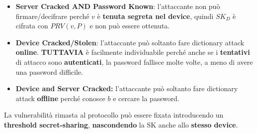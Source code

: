 \begin{itemize}
    \item \textbf{Server Cracked AND Password Known}: l'attaccante non può firmare/decifrare perché $v$ è \textbf{tenuta segreta nel device}, quindi $SK_D$ è cifrata con $PRV(v,P)$ e non può essere ottenuta.
    \item \textbf{Device Cracked/Stolen}: l'attaccante può soltanto fare dictionary attack \textbf{online}. \textbf{TUTTAVIA} è facilmente individuabile perché anche se i \textbf{tentativi} di attacco sono \textbf{autenticati}, la password fallisce molte volte, a meno di avere una password difficile.
    \item \textbf{Device and Server Cracked:} l'attaccante può soltanto fare dictionary attack \textbf{offline} perché conosce $b$ e cercare la password.
\end{itemize}
La vulnerabilità rimasta al protocollo può essere fixata introducendo un \textbf{threshold secret-sharing}, \textbf{nascondendo} la SK anche allo \textbf{stesso device}.
